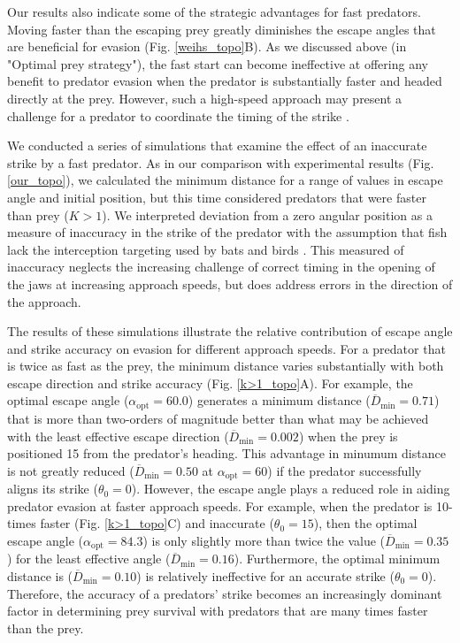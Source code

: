 \documentclass[12pt]{article}
\newcommand{\ol}{\overline}
\begin{document}
Our results also indicate some of the strategic advantages for fast predators.
Moving faster than the escaping prey greatly diminishes the escape angles that
are beneficial for evasion (Fig. \ref{weihs_topo}B). As we discussed above (in
"Optimal prey strategy"), the fast start can become ineffective at offering any
benefit to predator evasion when the predator is substantially faster and
headed directly at the prey. However, such a high-speed approach may present a
challenge for a predator to coordinate the timing of the strike
\citep{Higham:2007go, Higham:2005iu}. 

We conducted a series of simulations that examine the effect of an inaccurate
strike by a fast predator. As in our comparison with experimental results (Fig.
\ref{our_topo}), we calculated the minimum distance for a range of values in
escape angle and initial position, but this time considered predators that were
faster than prey ($K>1$). We interpreted deviation from a zero angular position
as a measure of inaccuracy in the strike of the predator with the assumption
that fish lack the interception targeting used by bats \citep{Ghose:2006dk} and
birds \citep{Kane:2014fs}. This measured of inaccuracy neglects the increasing
challenge of correct timing in the opening of the jaws at increasing approach
speeds, but does address errors in the direction of the approach.

The results of these simulations illustrate the relative contribution of escape
angle and strike accuracy on evasion for different approach speeds. For a
predator that is twice as fast as the prey, the minimum distance varies
substantially with both escape direction and strike accuracy (Fig.
\ref{k>1_topo}A). For example, the optimal escape angle
($\alpha_{\text{opt}}=60.0$\textdegree) generates a minimum distance ($\ol
D_{\text{min}}=0.71$) that is more than two-orders of magnitude better than
what may be achieved with the least effective escape direction ($\ol
D_{\text{min}}=0.002$) when the prey is positioned 15\textdegree\hspace{0.5pt}
from the predator's heading. This advantage in minumum distance is not greatly
reduced ($\ol D_{\text{min}}=0.50$ at $\alpha_{\text{opt}}=60$\textdegree) if
the predator successfully aligns its strike ($\theta_0=0$\textdegree). However,
the escape angle plays a reduced role in aiding predator evasion at faster
approach speeds. For example, when the predator is 10-times faster  (Fig.
\ref{k>1_topo}C) and inaccurate ($\theta_0=15$\textdegree), then the optimal
escape angle ($\alpha_{\text{opt}}=84.3$\textdegree) is only slightly more than
twice the value ($\ol D_{\text{min}}=0.35$) for the least effective angle ($\ol
D_{\text{min}}=0.16$). Furthermore, the optimal minimum distance is ($\ol
D_{\text{min}}=0.10$) is relatively ineffective for an accurate strike
($\theta_0=0$\textdegree). Therefore, the accuracy of a predators' strike
becomes an increasingly dominant factor in determining prey survival with
predators that are many times faster than the prey.
\end{document}
